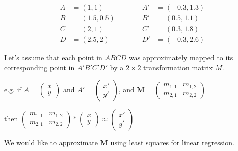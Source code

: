 \begin{equation}
\begin{split}
A&=(1, 1)\\
B&=(1.5, 0.5)\\
C&=(2, 1)\\
D&=(2.5, 2)
\end{split}
\quad\quad\quad
\begin{split}
A'&=(-0.3, 1.3)\\
B'&=(0.5, 1.1)\\
C'&=(0.3, 1.8)\\
D'&=(-0.3, 2.6)
\end{split}
\end{equation}

Let's assume that each point in $ABCD$ was approximately mapped to its corresponding point in $A'B'C'D'$ by a $2\times2$ transformation matrix $M$.

e.g. if $A = \begin{pmatrix} x \\ y \end{pmatrix}$ and $A' = \begin{pmatrix} x' \\ y' \end{pmatrix}$, and $\boldsymbol{M} = \begin{pmatrix} m_{1,1} & m_{1,2} \\ m_{2,1} & m_{2,2} \end{pmatrix}$

then $\begin{pmatrix} m_{1,1} & m_{1,2} \\ m_{2,1} & m_{2,2} \end{pmatrix} * \begin{pmatrix} x \\ y \end{pmatrix} \approx \begin{pmatrix} x' \\ y' \end{pmatrix}$

We would like to approximate $\boldsymbol{M}$ using least squares for linear regression.

